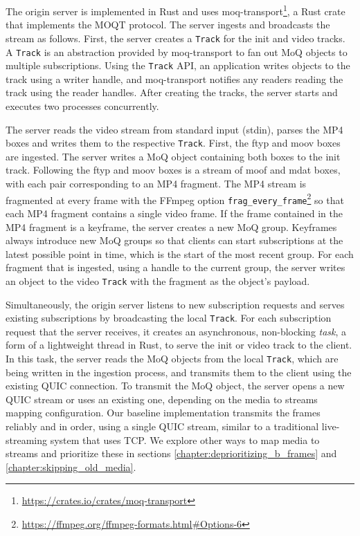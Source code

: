 The origin server is implemented in Rust and uses moq-transport\footnote{\url{https://crates.io/crates/moq-transport}}, a Rust crate that implements the \ac{MOQT} protocol. The server ingests and broadcasts the stream as follows. First, the server creates a \lstinline{Track} for the init and video tracks. A \lstinline{Track} is an abstraction provided by moq-transport to fan out MoQ objects to multiple subscriptions. Using the \lstinline{Track} API, an application writes objects to the track using a writer handle, and moq-transport notifies any readers reading the track using the reader handles. After creating the tracks, the server starts and executes two processes concurrently.

The server reads the video stream from standard input (stdin), parses the MP4 boxes and writes them to the respective \lstinline{Track}. First, the ftyp and moov boxes are ingested. The server writes a MoQ object containing both boxes to the init track. Following the ftyp and moov boxes is a stream of moof and mdat boxes, with each pair corresponding to an MP4 fragment. The MP4 stream is fragmented at every frame with the FFmpeg option \lstinline{frag_every_frame}\footnote{\url{https://ffmpeg.org/ffmpeg-formats.html\#Options-6}} so that each MP4 fragment contains a single video frame. If the frame contained in the MP4 fragment is a keyframe, the server creates a new MoQ group. Keyframes always introduce new MoQ groups so that clients can start subscriptions at the latest possible point in time, which is the start of the most recent group. For each fragment that is ingested, using a handle to the current group, the server writes an object to the video \lstinline{Track} with the fragment as the object's payload.

Simultaneously, the origin server listens to new subscription requests and serves existing subscriptions by broadcasting the local \lstinline{Track}. For each subscription request that the server receives, it creates an asynchronous, non-blocking \textit{task}, a form of a lightweight thread in Rust, to serve the init or video track to the client. In this task, the server reads the MoQ objects from the local \lstinline{Track}, which are being written in the ingestion process, and transmits them to the client using the existing QUIC connection. To transmit the MoQ object, the server opens a new QUIC stream or uses an existing one, depending on the media to streams mapping configuration. Our baseline implementation transmits the frames reliably and in order, using a single QUIC stream, similar to a traditional live-streaming system that uses TCP. We explore other ways to map media to streams and prioritize these in sections \ref{chapter:deprioritizing_b_frames} and \ref{chapter:skipping_old_media}.


